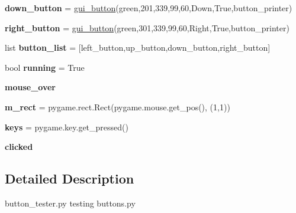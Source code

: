 \begin{DoxyCompactItemize}
{\bfseries down\+\_\+button} = \hyperlink{class_buttons_1_1gui__button}{gui\+\_\+button}(green,201,339,99,60,\textquotesingle{}Down\textquotesingle{},True,button\+\_\+printer)
\item 
\mbox{\label{namespacebutton__tester_a438a74fbcd486ba8b6bb2b7fb20bbf28}} 
{\bfseries right\+\_\+button} = \hyperlink{class_buttons_1_1gui__button}{gui\+\_\+button}(green,301,339,99,60,\textquotesingle{}Right\textquotesingle{},True,button\+\_\+printer)
\item 
\mbox{\label{namespacebutton__tester_adbdab40d2d78f5d605a00900957b0124}} 
list {\bfseries button\+\_\+list} = \mbox{[}left\+\_\+button,up\+\_\+button,down\+\_\+button,right\+\_\+button\mbox{]}
\item 
\mbox{\label{namespacebutton__tester_ae3ed0afcadfe7c8cbe48ddb10ac18a50}} 
bool {\bfseries running} = True
\item 
\mbox{\label{namespacebutton__tester_a96cfe9ecd14b567b1295e8278ad93fb4}} 
{\bfseries mouse\+\_\+over}
\item 
\mbox{\label{namespacebutton__tester_a3b8f3d949ea75e92fb6850f081418da3}} 
{\bfseries m\+\_\+rect} = pygame.\+rect.\+Rect(pygame.\+mouse.\+get\+\_\+pos(), (1,1))
\item 
\mbox{\label{namespacebutton__tester_a589ba8b092f8537c87c864d50c94612c}} 
{\bfseries keys} = pygame.\+key.\+get\+\_\+pressed()
\item 
\mbox{\label{namespacebutton__tester_ae0ee1abc2da918f33e6fbd8ae2b71657}} 
{\bfseries clicked}
\end{DoxyCompactItemize}


\subsection{Detailed Description}
\begin{DoxyVerb}button_tester.py
testing buttons.py
\end{DoxyVerb}
 
